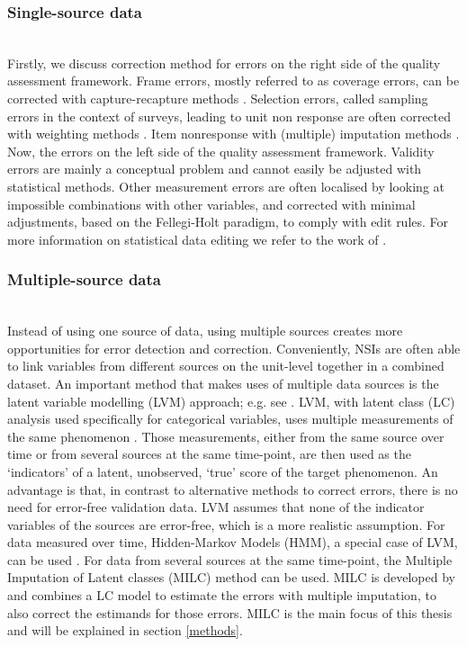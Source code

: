 \documentclass[a4paper, 11pt]{article} %
\begin{document}
\subsubsection{Single-source data}
\\Firstly, we discuss correction method for errors on the right side of the quality assessment framework. Frame errors, mostly referred to as coverage errors, can be corrected with capture-recapture methods . Selection errors, called sampling errors in the context of surveys, leading to unit non response are often corrected with weighting methods . Item nonresponse with (multiple) imputation methods \cite{handbookflexibleimputation_buuren2012}. 
\\ Now, the errors on the left side of the quality assessment framework. Validity errors are mainly a conceptual problem and cannot easily be adjusted with statistical methods. Other measurement errors are often localised by looking at impossible combinations with other variables, and corrected with minimal adjustments, based on the Fellegi-Holt paradigm, to comply with edit rules. For more information on statistical data editing we refer to the work of . 

\subsubsection{Multiple-source data}
\\ Instead of using one source of data, using multiple sources creates more opportunities for error detection and correction. Conveniently, NSIs are often able to link variables from different sources on the unit-level together in a combined dataset. An important method that makes uses of multiple data sources is the latent variable modelling (LVM) approach; e.g. see . LVM, with latent class (LC) analysis used specifically for categorical variables, uses multiple measurements of the same phenomenon \cite{Oberski2017LC}. Those measurements, either from the same source over time or from several sources at the same time-point, are then used as the ‘indicators’ of a latent, unobserved, ‘true’ score of the target phenomenon. An advantage is that, in contrast to alternative methods to correct errors, there is no need for error-free validation data. LVM assumes that none of the indicator variables of the sources are error-free, which is a more realistic assumption. For data measured over time, Hidden-Markov Models (HMM), a special case of LVM, can be used . For data from several sources at the same time-point, the Multiple Imputation of Latent classes (MILC) method can be used. MILC is developed by  and combines a LC model to estimate the errors with multiple imputation, to also correct the estimands for those errors. MILC is the main focus of this thesis and will be explained in section \ref{methods}.
\end{document}
